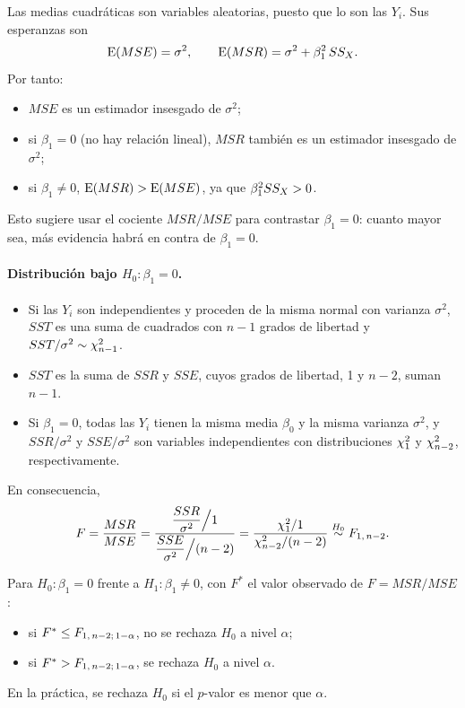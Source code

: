 Las medias cuadráticas son variables aleatorias, puesto que lo son las $Y_i$. Sus esperanzas son
\[
  \operatorname{E}(MSE) = \sigma^2, \qquad \operatorname{E}(MSR) = \sigma^2 + \beta_1^2\,SS_X .
\]
Por tanto:
\begin{itemize}
  \item $MSE$ es un estimador insesgado de $\sigma^2$;
  \item si $\beta_1=0$ (no hay relación lineal), $MSR$ también es un estimador insesgado de
    $\sigma^2$;
  \item si $\beta_1\neq0$, $\operatorname{E}(MSR)>\operatorname{E}(MSE)$, ya que $\beta_1^2SS_X>0$.
\end{itemize}
Esto sugiere usar el cociente $MSR/MSE$ para contrastar $\beta_1=0$: cuanto mayor sea, más
evidencia habrá en contra de $\beta_1=0$.

\paragraph{Distribución bajo $H_0\colon\beta_1=0$.}
\begin{itemize}
  \item Si las $Y_i$ son independientes y proceden de la misma normal con varianza $\sigma^2$,
    $SST$ es una suma de cuadrados con $n-1$ grados de libertad y $SST/\sigma^2\sim\chi^2_{n-1}$.
  \item $SST$ es la suma de $SSR$ y $SSE$, cuyos grados de libertad, 1 y $n-2$, suman $n-1$.
  \item Si $\beta_1=0$, todas las $Y_i$ tienen la misma media $\beta_0$ y la misma varianza
    $\sigma^2$, y $SSR/\sigma^2$ y $SSE/\sigma^2$ son variables independientes con distribuciones
    $\chi^2_{1}$ y $\chi^2_{n-2}$, respectivamente.
\end{itemize}
En consecuencia,
\[
  F = \frac{MSR}{MSE} = \frac{\dfrac{SSR}{\sigma^2}\Big/1}{\dfrac{SSE}{\sigma^2}\Big/(n-2)}
  = \frac{\chi^2_{1}/1}{\chi^2_{n-2}/(n-2)} \overset{H_0}{\sim} F_{1,\,n-2} .
\]

\begin{resumen}
  Para $H_0\colon\beta_1=0$ frente a $H_1\colon\beta_1\neq0$, con $F^*$ el valor observado de
  $F=MSR/MSE$:
  \begin{itemize}
    \item si $F^*\le F_{1,\,n-2;\,1-\alpha}$, no se rechaza $H_0$ a nivel $\alpha$;
    \item si $F^*>F_{1,\,n-2;\,1-\alpha}$, se rechaza $H_0$ a nivel $\alpha$.
  \end{itemize}
  En la práctica, se rechaza $H_0$ si el $p$-valor es menor que $\alpha$.
\end{resumen}

